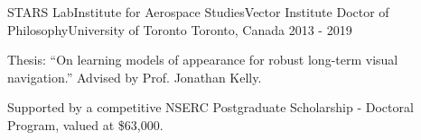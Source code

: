

\begin{cventries}

  \cventry
    {STARS Lab{\awesomesep}Institute for Aerospace Studies{\awesomesep}Vector Institute} %
    {Doctor of Philosophy{\awesomesep}University of Toronto} %
    {Toronto, Canada} %
    {2013 - 2019}
    {
      \begin{cvitems} %
        \item {Thesis: ``On learning models of appearance for robust long-term visual navigation.'' Advised by Prof. Jonathan Kelly.}
        \item {Supported by a competitive NSERC Postgraduate Scholarship - Doctoral Program, valued at \$63,000.}
      \end{cvitems}
    }



\end{cventries}
